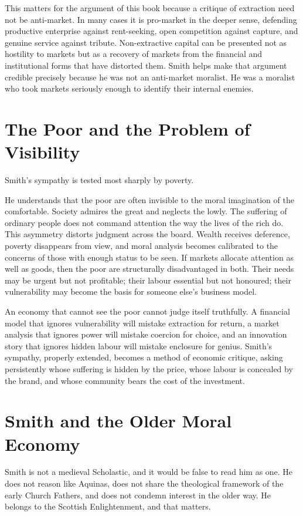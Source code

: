 \documentclass[11pt,a4paper,oneside]{book}
\begin{document}
This matters for the argument of this book because a critique of extraction need not be anti-market. In many cases it is pro-market in the deeper sense, defending productive enterprise against rent-seeking, open competition against capture, and genuine service against tribute. Non-extractive capital can be presented not as hostility to markets but as a recovery of markets from the financial and institutional forms that have distorted them. Smith helps make that argument credible precisely because he was not an anti-market moralist. He was a moralist who took markets seriously enough to identify their internal enemies.

\section*{The Poor and the Problem of Visibility}

Smith's sympathy is tested most sharply by poverty.

He understands that the poor are often invisible to the moral imagination of the comfortable. Society admires the great and neglects the lowly. The suffering of ordinary people does not command attention the way the lives of the rich do. This asymmetry distorts judgment across the board. Wealth receives deference, poverty disappears from view, and moral analysis becomes calibrated to the concerns of those with enough status to be seen. If markets allocate attention as well as goods, then the poor are structurally disadvantaged in both. Their needs may be urgent but not profitable; their labour essential but not honoured; their vulnerability may become the basis for someone else's business model.

An economy that cannot see the poor cannot judge itself truthfully. A financial model that ignores vulnerability will mistake extraction for return, a market analysis that ignores power will mistake coercion for choice, and an innovation story that ignores hidden labour will mistake enclosure for genius. Smith's sympathy, properly extended, becomes a method of economic critique, asking persistently whose suffering is hidden by the price, whose labour is concealed by the brand, and whose community bears the cost of the investment.

\section*{Smith and the Older Moral Economy}

Smith is not a medieval Scholastic, and it would be false to read him as one. He does not reason like Aquinas, does not share the theological framework of the early Church Fathers, and does not condemn interest in the older way. He belongs to the Scottish Enlightenment, and that matters.
\end{document}
